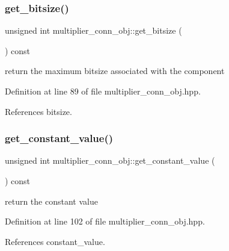 \subsubsection{\texorpdfstring{get\+\_\+bitsize()}{get\_bitsize()}}
{\footnotesize\ttfamily unsigned int multiplier\+\_\+conn\+\_\+obj\+::get\+\_\+bitsize (\begin{DoxyParamCaption}{ }\end{DoxyParamCaption}) const\hspace{0.3cm}{\ttfamily [inline]}}



return the maximum bitsize associated with the component 



Definition at line 89 of file multiplier\+\_\+conn\+\_\+obj.\+hpp.



References bitsize.

\mbox{\label{classmultiplier__conn__obj_a5154bb990696cc092764c9434c66d446}} 
\subsubsection{\texorpdfstring{get\+\_\+constant\+\_\+value()}{get\_constant\_value()}}
{\footnotesize\ttfamily unsigned int multiplier\+\_\+conn\+\_\+obj\+::get\+\_\+constant\+\_\+value (\begin{DoxyParamCaption}{ }\end{DoxyParamCaption}) const\hspace{0.3cm}{\ttfamily [inline]}}



return the constant value 



Definition at line 102 of file multiplier\+\_\+conn\+\_\+obj.\+hpp.



References constant\+\_\+value.

\mbox{\label{classmultiplier__conn__obj_a1aab6e4ac04b1f89ff72009773de04de}} 
